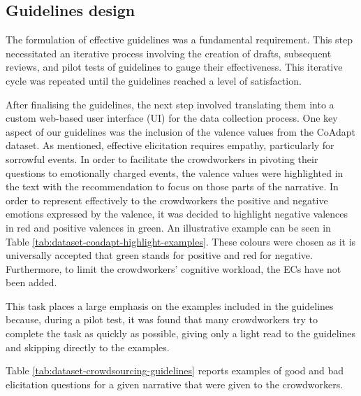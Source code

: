 \subsection{Guidelines design}
The formulation of effective guidelines was a fundamental requirement. This step necessitated an iterative process involving the creation of drafts, subsequent reviews, and pilot tests of guidelines to gauge their effectiveness. This iterative cycle was repeated until the guidelines reached a level of satisfaction.

After finalising the guidelines, the next step involved translating them into a custom web-based user interface (UI) for the data collection process. One key aspect of our guidelines was the inclusion of the valence values from the CoAdapt dataset. 
As mentioned, effective elicitation requires empathy, particularly for sorrowful events. In order to facilitate the crowdworkers in pivoting their questions to emotionally charged events, the valence values were highlighted in the text with the recommendation to focus on those parts of the narrative. In order to represent effectively to the crowdworkers the positive and negative emotions expressed by the valence, it was decided to highlight negative valences in red and positive valences in green. An illustrative example can be seen in Table \ref{tab:dataset-coadapt-highlight-examples}. These colours were chosen as it is universally accepted that green stands for positive and red for negative. Furthermore, to limit the crowdworkers' cognitive workload, the ECs have not been added.

This task places a large emphasis on the examples included in the guidelines because, during a pilot test, it was found that many crowdworkers try to complete the task as quickly as possible, giving only a light read to the guidelines and skipping directly to the examples. 

Table \ref{tab:dataset-crowdsourcing-guidelines} reports examples of good and bad elicitation questions for a given narrative that were given to the crowdworkers. 

